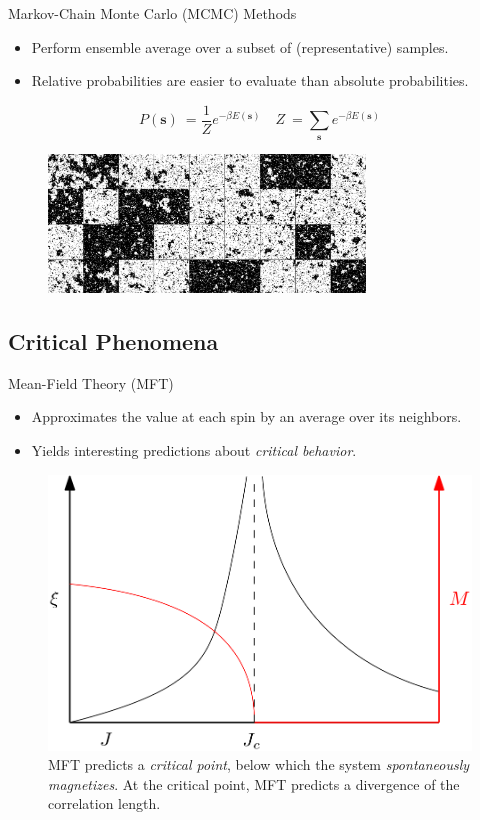 \documentclass{beamer}
\newcommand{\bolds}[1]{\boldsymbol{#1}}
\newcommand{\bs}{\bolds{s}}
\renewcommand{\b}{\beta}
\begin{document}
\begin{frame}{Markov-Chain Monte Carlo (MCMC) Methods}
  \begin{itemize}
  \item Perform ensemble average over a subset of (representative)
    samples.
  \item Relative probabilities are easier to evaluate than absolute
    probabilities.
  \end{itemize}

   \begin{equation*}%
     \boxed{P(\bs)\:=\frac{1}{Z}e^{-\b E(\bs)}\quad Z\:=\sum_{\bs} e^{-\b E(\bs)}}
   \end{equation*}%

\begin{figure}[ht]
  \centering \includegraphics[width=0.75\textwidth]{figures/samples.png}
\end{figure}

\end{frame}

\subsection{Critical Phenomena}
\begin{frame}{Mean-Field Theory (MFT)}
  \begin{itemize}
  \item Approximates the value at each spin by an average over its
    neighbors.
  \item Yields interesting predictions about
    \textit{critical behavior}.
  \end{itemize}

\begin{figure}[ht]
  \centering
  \includegraphics[width=.5\textwidth]{figures/correlation-length.png}
  \caption{MFT predicts a \textit{critical point}, below which the
    system \textit{spontaneously magnetizes}. At the critical point,
    MFT predicts a divergence of the correlation length.}
\end{figure}
\end{frame}
\end{document}
